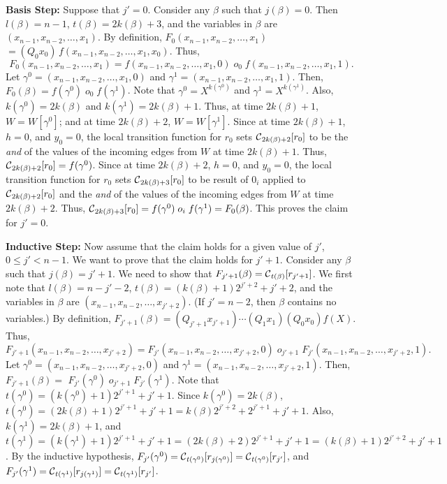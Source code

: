 {\bf Basis Step:} Suppose that $j' = 0$.
Consider any $\beta$ such that $j(\beta) = 0$.
Then $l(\beta) = n-1$, $t(\beta) = 2k(\beta) + 3$,
and the variables in $\beta$ are $(x_{n-1}, x_{n-2}, \ldots , x_1)$.
By definition,
$F_0(x_{n-1}, x_{n-2}, \ldots , x_1)$ $= (Q_0 x_0) \, f(x_{n-1}, x_{n-2}, \ldots , x_1, x_0)$.
Thus,
$$F_0(x_{n-1}, x_{n-2}, \ldots , x_1) =  
f(x_{n-1}, x_{n-2}, \ldots , x_1, 0) \; o_0 \; f(x_{n-1}, x_{n-2}, \ldots , x_1, 1).$$
Let $\gamma^0 = (x_{n-1}, x_{n-2}, \ldots , x_1, 0)$
and $\gamma^1 = (x_{n-1}, x_{n-2}, \ldots , x_1, 1)$.
Then, $F_0(\beta) =  
f(\gamma^0) \; o_0 \; f(\gamma^1)$.
Note that $\gamma^0 = X^{k(\gamma^0)}$ and $\gamma^1 = X^{k(\gamma^1)}$.
Also, $k(\gamma^0) = 2k(\beta)$ and $k(\gamma^1) = 2k(\beta)+1$.
Thus, at time $2k(\beta)+1$, $W = W[\gamma^0]$;
and at time $2k(\beta)+2$, $W = W[\gamma^1]$.
Since at time $2k(\beta)+1$, $h=0$, and $y_0 = 0$, 
the local transition function for $r_0$ sets $\mbox{$\mathcal{C}$}_{2k(\beta)+2}[r_0]$ to be 
the {\em and} of the values of the incoming edges from $W$ at time $2k(\beta)+1$.
Thus, $\mbox{$\mathcal{C}$}_{2k(\beta)+2}[r_0] = f(\gamma^0)$.
Since at time $2k(\beta)+2$, $h=0$, and $y_0 = 0$, 
the local transition function for $r_0$ sets $\mbox{$\mathcal{C}$}_{2k(\beta)+3}[r_0]$ to be result of $0_i$
applied to $\mbox{$\mathcal{C}$}_{2k(\beta)+2}[r_0]$ and
the {\em and} of the values of the incoming edges from $W$ at time $2k(\beta)+2$.
Thus, $\mbox{$\mathcal{C}$}_{2k(\beta)+3}[r_0] = f(\gamma^0) \; o_i \; f(\gamma^1) = F_0(\beta)$.
This proves the claim for $j' = 0$.

{\bf Inductive Step:} 
Now assume that the claim holds for a given value of $j'$, $0 \leq j' < n-1$.
We want to prove that the claim holds for $j'+1$.
Consider any $\beta$ such that $j(\beta) = j'+1$.
We need to show that $F_{j'+1}(\beta) = \mbox{$\mathcal{C}$}_{t(\beta)}[r_{j'+1}]$.
We first note that $l(\beta) = n-j'-2$, 
$t(\beta) = (k(\beta) + 1)2^{j'+2}+j'+2$,
and the variables in $\beta$ are $(x_{n-1}, x_{n-2}, \ldots , x_{j'+2})$.
(If $j' = n-2$, then $\beta$ contains no variables.)
By definition, 
$F_{j'+1}(\beta) =  (Q_{j'+1} x_{j'+1}) \cdots (Q_1 x_1) (Q_0 x_0) f(X)$.
Thus,
$$F_{j'+1}(x_{n-1}, x_{n-2}, \ldots , x_{j'+2}) =  
F_{j'}(x_{n-1}, x_{n-2}, \ldots , x_{j'+2}, 0) \; o_{j'+1} \; F_{j'}(x_{n-1}, x_{n-2}, \ldots , x_{j'+2}, 1).$$
Let $\gamma^0 = (x_{n-1}, x_{n-2}, \ldots , x_{j'+2}, 0)$
and $\gamma^1 = (x_{n-1}, x_{n-2}, \ldots , x_{j'+2}, 1)$.
Then, $F_{j'+1}(\beta) =$  
$F_{j'}(\gamma^0) \; o_{j'+1} \; F_{j'}(\gamma^1)$.
Note that
$t(\gamma^0) = (k(\gamma^0)+1)2^{j'+1}+j'+1$.
Since $k(\gamma^0)= 2k(\beta)$,
$t(\gamma^0) = (2k(\beta)+1)2^{j'+1}+j'+1 = k(\beta)2^{j'+2}+2^{j'+1}+j'+1$.
Also, $k(\gamma^1)= 2k(\beta)+1$, and
$t(\gamma^1) = (k(\gamma^1)+1)2^{j'+1}+j'+1= 
(2k(\beta)+2)2^{j'+1}+j'+1 =  (k(\beta)+1)2^{j'+2}+j'+1$.
By the inductive hypothesis,
$F_{j'}(\gamma^0) = \mbox{$\mathcal{C}$}_{t(\gamma^0)}[r_{j(\gamma^0)}] = \mbox{$\mathcal{C}$}_{t(\gamma^0)}[r_{j'}]$,
and $F_{j'}(\gamma^1) = \mbox{$\mathcal{C}$}_{t(\gamma^1)}[r_{j(\gamma^1)}] = \mbox{$\mathcal{C}$}_{t(\gamma^1)}[r_{j'}]$.


